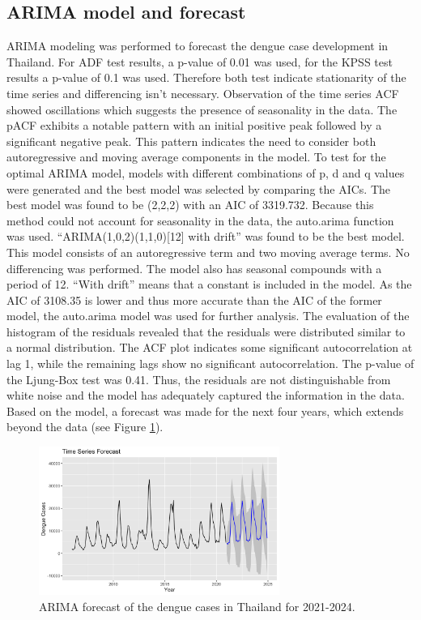 	\subsection{ARIMA model and forecast}
	
	ARIMA modeling was performed to forecast the dengue case development in Thailand. For ADF test results, a p-value of 0.01 was used, for the KPSS test results a p-value of 0.1 was used. Therefore both test indicate stationarity of the time series and differencing isn’t necessary. Observation of the time series ACF showed oscillations which suggests the presence of seasonality in the data. The pACF exhibits a notable pattern with an initial positive peak followed by a significant negative peak. This pattern indicates the need to consider both autoregressive and moving average components in the model.
	To test for the optimal ARIMA model, models with different combinations of p, d and q values were generated and the best model was selected by comparing the AICs. The best model was found to be (2,2,2) with an AIC of 3319.732. Because this method could not account for seasonality in the data, the auto.arima function was used. “ARIMA(1,0,2)(1,1,0)[12] with drift” was found to be the best model. This model consists of an autoregressive term and two moving average terms. No differencing was performed. The model also has seasonal compounds with a period of 12. “With drift” means that a constant is included in the model. As the AIC of 3108.35 is lower and thus more accurate than the AIC of the former model, the auto.arima model was used for further analysis. 
	The evaluation of the histogram of the residuals revealed that the residuals were distributed similar to a normal distribution. The ACF plot indicates some significant autocorrelation at lag 1, while the remaining lags show no significant autocorrelation. The p-value of the Ljung-Box test was 0.41. Thus, the residuals are not distinguishable from white noise and the model has adequately captured the information in the data. 
	Based on the model, a forecast was made for the next four years, which extends beyond the data (see Figure \ref{fig:Auto_ARIMA_forecast}). 
	
		\begin{figure}[hbpt] 
		\centering
		\includegraphics[width=0.7\textwidth]{fig/Auto_ARIMA_forecast.png}
		\caption{ARIMA forecast of the dengue cases in Thailand for 2021-2024.}
		\label{fig:Auto_ARIMA_forecast}
	\end{figure}
 
